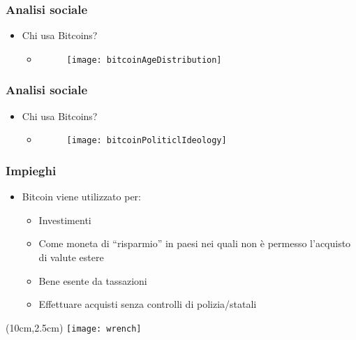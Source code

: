 \begin{frame}
 \frametitle{Analisi sociale}

 \begin{itemize}
  \item Chi usa Bitcoins?
  \begin{itemize}
   \item[]
   \begin{figure}
    \centering
    \texttt{[image: bitcoinAgeDistribution]}
   \end{figure}

  \end{itemize}

 \end{itemize}

\end{frame}


\begin{frame}
 \frametitle{Analisi sociale}

 \begin{itemize}
  \item Chi usa Bitcoins?
  \begin{itemize}
   \item[]
   \begin{figure}
    \centering
    \texttt{[image: bitcoinPoliticlIdeology]}
   \end{figure}

  \end{itemize}

 \end{itemize}

\end{frame}


\begin{frame}
 \frametitle{Impieghi}

 \begin{itemize}
  \item<1-> Bitcoin viene utilizzato per:
  \begin{itemize}
   \item<2-> Investimenti
   \item<3-> Come moneta di ``risparmio'' in paesi nei quali non \`e permesso
l'acquisto di valute estere
   \item<4-> Bene esente da tassazioni
   \item<5-> Effettuare acquisti senza controlli di polizia/statali
  \end{itemize}

 \end{itemize}


 \begin{textblock*}{5cm}(10cm,2.5cm)
  \texttt{[image: wrench]}
 \end{textblock*}

\end{frame}
